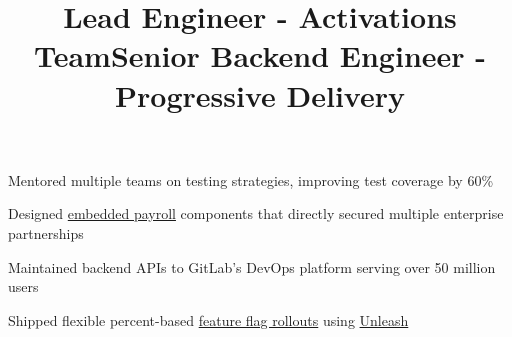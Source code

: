 \documentclass[12pt, line]{res}
\let\tempone\itemize
\let\temptwo\enditemize
\renewenvironment{itemize}{%
  \setlength{\topsep}{0pt}%
  \setlength{\partopsep}{0pt}%
  \tempone
  \renewcommand{\labelitemi}{$\bullet$}%
  \vspace{-0.25in}%
  \setlength{\itemsep}{3pt}%
  \setlength{\parsep}{0pt}%
}{%
  \temptwo
}
\begin{document}
\begin{resume}
  \title{Lead Engineer - Activations Team}
  \begin{position}
    \begin{itemize}
      \item Mentored multiple teams on testing strategies, improving test coverage by 60\%
      \item Designed \href{https://www.checkhq.com/?contact-form=false}{embedded payroll} components that directly secured multiple enterprise partnerships
    \end{itemize}
  \end{position}

  \pagebreak

  \title{Senior Backend Engineer - Progressive Delivery}
  \begin{position}
    \begin{itemize}
      \item Maintained backend APIs to GitLab's DevOps platform serving over 50 million users
      \item Shipped flexible percent-based \href{https://docs.gitlab.com/operations/feature_flags/#percent-rollout}{feature flag rollouts} using \href{https://www.getunleash.io/}{Unleash}
    \end{itemize}
  \end{position}


\end{resume}
\end{document}
